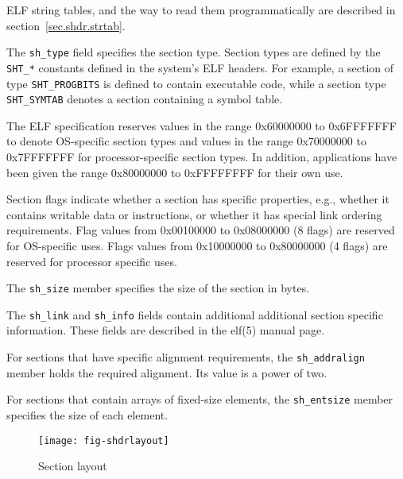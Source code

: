 \documentclass[a4paper]{book}
\makeatletter
\newcommand{\constant}[1]{\texttt{#1}}
\newcommand{\parameter}[1]{\texttt{#1}}
\newenvironment{callout}[2][blue]{%
  \begingroup\newcommand{\@cocolor}{#1}%
  \newcommand{\@cogroup}[1]{#2}}{\endgroup}
\newcommand{\@co}[1]{\framebox{\textbf{\color{\@cocolor}#1}}}
\newcommand{\coref}[1]{%
  \hypertarget{\@cogroup.#1.cr}{%
    \hyperlink{\@cogroup.#1.co}{\@co{#1}}}}
\makeatother
\begin{document}
\begin{callout}{shdr}
\begin{description}
    ELF string tables, and the way to read them programmatically are
    described in section~\vref{sec.shdr.strtab}.

  \item[\coref{2}] The \parameter{sh\_type} field specifies the
    section type.  Section types are defined by the \constant{SHT\_*}
    constants defined in the system's ELF headers.  For example, a
    section of type \constant{SHT\_PROGBITS} is defined to contain
    executable code, while a section type \constant{SHT\_SYMTAB}
    denotes a section containing a symbol table.

    The ELF specification reserves values in the range 0x60000000 to
    0x6FFFFFFF to denote OS-specific section types and values in the
    range 0x70000000 to 0x7FFFFFFF for processor-specific section
    types.  In addition, applications have been given the range
    0x80000000 to 0xFFFFFFFF for their own use.

  \item[\coref{3}] Section flags indicate whether a section has
    specific properties, e.g., whether it contains writable data or
    instructions, or whether it has special link ordering
    requirements.  Flag values from 0x00100000 to 0x08000000 (8 flags)
    are reserved for OS-specific uses.  Flags values from 0x10000000
    to 0x80000000 (4 flags) are reserved for processor specific uses.

  \item[\coref{4}] The \parameter{sh\_size} member specifies the size
    of the section in bytes.

  \item[\coref{5} \coref{6}] The \parameter{sh\_link} and
    \parameter{sh\_info} fields contain additional additional section
    specific information.  These fields are described in the elf(5)
    manual page.

  \item[\coref{7}] For sections that have specific alignment
    requirements, the \parameter{sh\_addralign} member holds the
    required alignment.  Its value is a power of two.

  \item[\coref{8}] For sections that contain arrays of fixed-size
    elements, the \parameter{sh\_entsize} member specifies the size of
    each element.
  \end{description}
\end{callout}

\begin{figure}
  \begin{center}
    \texttt{[image: fig-shdrlayout]}
  \end{center}
  \caption{Section layout}\label{fig.elf.shdrlayout}
\end{figure}
\end{document}
